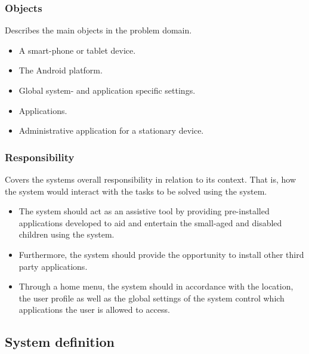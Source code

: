 \subsubsection{Objects} 
Describes the main objects in the problem domain.
\begin{itemize}
	\item A smart-phone or tablet device. 
	\item The Android platform. 
	\item Global system- and application specific settings. 
	\item Applications.
	\item Administrative application for a stationary device.
\end{itemize}

\subsubsection{Responsibility} 
Covers the systems overall responsibility in relation to its context. That is, how the system would interact with the tasks to be solved using the system.
\begin{itemize}
	\item The system should act as an assistive tool by providing pre-installed applications developed to aid and entertain the small-aged and disabled children using the system. 
	\item Furthermore, the system should provide the opportunity to install other third party applications. 
	\item Through a home menu, the system should in accordance with the location, the user profile as well as the global settings of the system control which applications the user is allowed to access.
\end{itemize}

\subsection{System definition}

